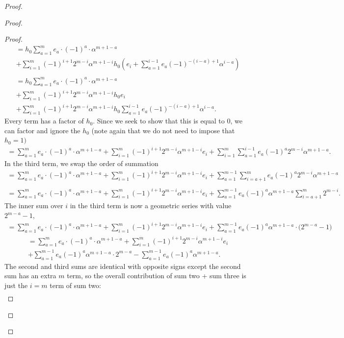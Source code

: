 \documentclass[11pt]{article}
\theoremstyle{plain}
\theoremstyle{definition}
\theoremstyle{definition}
\begin{document}
\begin{proof}
\begin{proof}
\begin{proof}
\begin{gather*}
=h_0 \sum_{a=1}^me_a\cdot(-1)^a\cdot \alpha^{m+1-a}\\
+\sum_{i=1}^m(-1)^{i+1}2^{m-i}\alpha^{m+1-i}h_0\left(e_i+\sum_{a=1}^{i-1}e_a(-1)^{-(i-a)+1}\alpha^{i-a}\right)\\\\
=h_0 \sum_{a=1}^me_a\cdot(-1)^a\cdot \alpha^{m+1-a}\\
+\sum_{i=1}^m(-1)^{i+1}2^{m-i}\alpha^{m+1-i}h_0e_i\\
+\sum_{i=1}^m(-1)^{i+1}2^{m-i}\alpha^{m+1-i}h_0\sum_{a=1}^{i-1}e_a(-1)^{-(i-a)+1}\alpha^{i-a}.
\end{gather*}
Every term has a factor of $h_0$. Since we seek to show that this is equal to 0, we can factor and ignore the $h_0$ (note again that we do not need to impose that $h_0=1)$
\begin{gather*}
=\sum_{a=1}^me_a\cdot(-1)^a\cdot \alpha^{m+1-a}+\sum_{i=1}^m(-1)^{i+1}2^{m-i}\alpha^{m+1-i}e_i+\sum_{i=1}^m\sum_{a=1}^{i-1}e_a(-1)^a2^{m-i}\alpha^{m+1-a}.
\end{gather*}
In the third term, we swap the order of summation
\begin{gather*}
= \sum_{a=1}^me_a\cdot(-1)^a\cdot \alpha^{m+1-a}+\sum_{i=1}^m(-1)^{i+1}2^{m-i}\alpha^{m+1-i}e_i+\sum_{a=1}^{m-1}\sum_{i=a+1}^{m}e_a(-1)^a2^{m-i}\alpha^{m+1-a}\\\\
=\sum_{a=1}^me_a\cdot(-1)^a\cdot \alpha^{m+1-a} +\sum_{i=1}^m(-1)^{i+1}2^{m-i}\alpha^{m+1-i}e_i +\sum_{a=1}^{m-1}e_a(-1)^a \alpha^{m+1-a}\sum_{i=a+1}^{m}2^{m-i}.
\end{gather*}
The inner sum over $i$ in the third term is now a geometric series with value $2^{m-a}-1$,
\begin{gather*}
= \sum_{a=1}^me_a\cdot(-1)^a\cdot \alpha^{m+1-a}+\sum_{i=1}^m(-1)^{i+1}2^{m-i}\alpha^{m+1-i}e_i+\sum_{a=1}^{m-1}e_a(-1)^a \alpha^{m+1-a}\cdot\big(2^{m-a}-1\big)
\end{gather*}
\begin{gather*}
= \sum_{a=1}^me_a\cdot(-1)^a\cdot \alpha^{m+1-a}+\sum_{i=1}^m(-1)^{i+1}2^{m-i}\alpha^{m+1-i}e_i\\
+\sum_{a=1}^{m-1}e_a(-1)^a \alpha^{m+1-a}\cdot 2^{m-a}-\sum_{a=1}^{m-1}e_a(-1)^a \alpha^{m+1-a}.
\end{gather*}
The second and third sums are identical with opposite signs except the second sum has an extra $m$ term, so the overall contribution of sum two + sum three is just the $i=m$ term of sum two:
\begin{gather*}

\end{gather*}
\end{proof}
\end{proof}
\end{proof}
\end{document}

